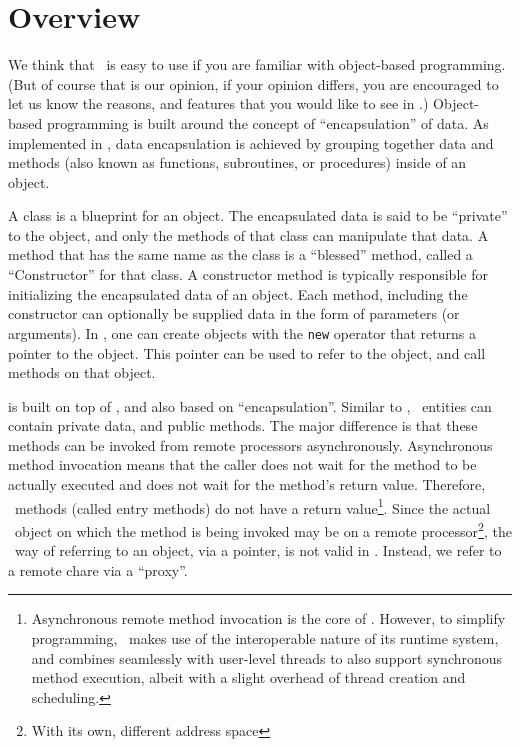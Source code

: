 \section{\charmpp{} Overview}

We think that \charmpp\ is easy to use if you are familiar with object-based
programming. (But of course that is our opinion, if your opinion differs,
you are encouraged to let us know the reasons, and features that you would
like to see in \charmpp.) Object-based programming is built around the
concept of ``encapsulation'' of data. As implemented in \CC, data
encapsulation is achieved by grouping together data and methods (also known
as functions, subroutines, or procedures) inside of an object.

A class is a blueprint for an object.  The encapsulated data is said to be
``private'' to the object, and only the methods of that class can manipulate
that data. A method that has the same name as the class is a ``blessed''
method, called a ``Constructor'' for that class.  A constructor method is
typically responsible for initializing the encapsulated data of an object.
Each method, including the constructor can optionally be supplied data in
the form of parameters (or arguments). In \CC, one can create objects with
the {\tt new} operator that returns a pointer to the object. This pointer
can be used to refer to the object, and call methods on that object.

\charmpp{} is built on top of \CC, and also based on ``encapsulation''.
Similar to \CC, \charmpp\ entities can contain private data, and public
methods. The major difference is that these methods can be invoked from
remote processors asynchronously.  Asynchronous method invocation means that
the caller does not wait for the method to be actually executed and does not
wait for the method's return value. Therefore, \charmpp\ methods (called
entry methods) do not have a return value\footnote{Asynchronous remote
method invocation is the core of \charmpp. However, to simplify programming,
\charmpp\ makes use of the interoperable nature of its runtime system, and
combines seamlessly with user-level threads to also support synchronous
method execution, albeit with a slight overhead of thread creation and
scheduling.}. Since the actual \charmpp\ object on which the method is being
invoked may be on a remote processor\footnote{With its own, different address
space}, the \CC\ way of referring to an object, via a pointer, is not valid
in \charmpp.  Instead, we refer to a remote chare via a ``proxy''.

